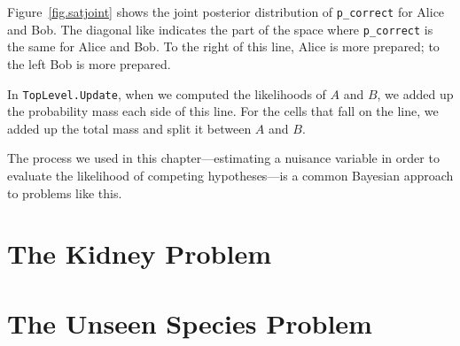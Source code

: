 \documentclass[12pt]{book}
\begin{document}
Figure~\ref{fig.satjoint} shows the joint posterior distribution of
\verb"p_correct" for Alice and Bob.  The diagonal like indicates the
part of the space where \verb"p_correct" is the same for Alice and
Bob.  To the right of this line, Alice is more prepared; to the left
Bob is more prepared.

In {\tt TopLevel.Update}, when we computed the likelihoods of $A$ and
$B$, we added up the probability mass each side of this line.  For the
cells that fall on the line, we added up the total mass and split it
between $A$ and $B$.

The process we used in this chapter---estimating a nuisance
variable in order to evaluate the likelihood of competing
hypotheses---is a common Bayesian approach to problems like this.


\chapter{The Kidney Problem}

\chapter{The Unseen Species Problem}
\end{document}
